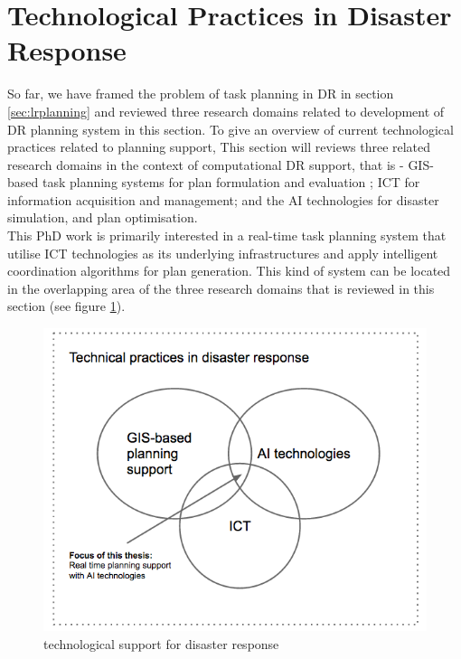 \section{Technological Practices in Disaster Response} \label{sec:LRApplicationAreas}
So far, we have framed the problem of task planning in \ac{DR} in section \ref{sec:lrplanning} and reviewed three research domains related to development of \ac{DR} planning system in this section. To give an overview of current technological practices related to planning support, This section will reviews three related research domains in the context of computational DR support, that is - \ac{GIS}-based task planning systems for plan formulation and evaluation ; \acf{ICT} for information acquisition and management; and the \acf{AI} technologies for disaster simulation, and plan optimisation.  \\

This PhD work is primarily interested in a real-time task planning system that utilise \ac{ICT} technologies as its underlying infrastructures and apply intelligent coordination algorithms for plan generation. This kind of system can be located in the overlapping area of the three research domains that is reviewed in this section (see figure \ref{fig:SystemFraming}).\\

\begin{figure}[h]
  \centering
  \includegraphics[width=1\textwidth]{img/background/SystemFraming}
  \caption{technological support for disaster response}
  \label{fig:SystemFraming}
\end{figure} 

